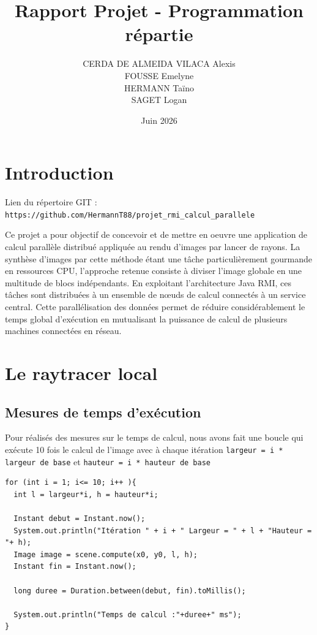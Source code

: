 \documentclass[a4paper,11pt]{article}
\title{Rapport Projet - Programmation répartie}
\author{CERDA DE ALMEIDA VILACA Alexis\\ FOUSSE Emelyne \\ HERMANN Taïno \\ SAGET Logan \\ }
\date{Juin 2026}
\begin{document}
\maketitle
\tableofcontents
\newpage

\section{Introduction}

Lien du répertoire GIT : \texttt{https://github.com/HermannT88/projet\_rmi\_calcul\_parallele}

Ce projet a pour objectif de concevoir et de mettre en oeuvre une application de calcul parallèle distribué appliquée au rendu d'images par lancer de rayons. La synthèse d'images par cette méthode étant une tâche particulièrement gourmande en ressources CPU, l'approche retenue consiste à diviser l'image globale en une multitude de blocs indépendants. En exploitant l'architecture Java RMI, ces tâches sont distribuées à un ensemble de nœuds de calcul connectés à un service central. Cette parallélisation des données permet de réduire considérablement le temps global d'exécution en mutualisant la puissance de calcul de plusieurs machines connectées en réseau.

\newpage

\section{Le raytracer local}

\subsection{Mesures de temps d'exécution}

Pour réalisés des mesures sur le temps de calcul, nous avons fait une boucle qui exécute 10 fois le calcul de l'image avec à chaque itération \texttt{largeur = i * largeur de base} et \texttt{hauteur = i * hauteur de base}

\begin{lstlisting}
for (int i = 1; i<= 10; i++ ){
  int l = largeur*i, h = hauteur*i;
  
  Instant debut = Instant.now();
  System.out.println("Itération " + i + " Largeur = " + l + "Hauteur = "+ h);
  Image image = scene.compute(x0, y0, l, h);
  Instant fin = Instant.now();

  long duree = Duration.between(debut, fin).toMillis();
            
  System.out.println("Temps de calcul :"+duree+" ms");
}
\end{lstlisting}
\end{document}

